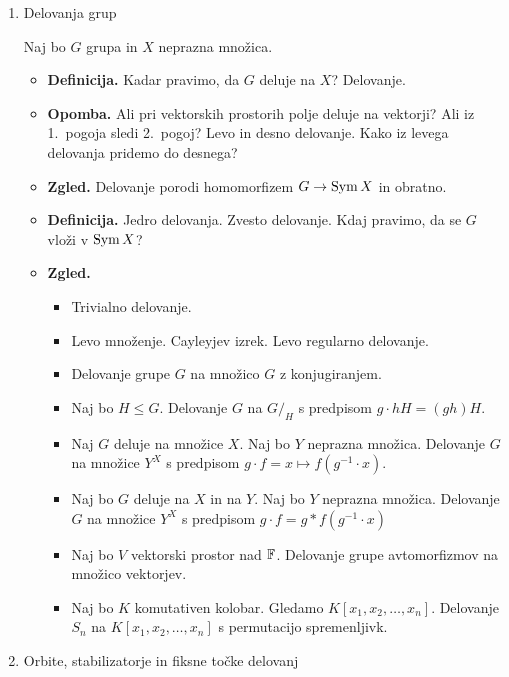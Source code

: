 \begin{enumerate}
\item Delovanja grup
    
    Naj bo \(G\) grupa in \(X\) neprazna množica.
    \begin{itemize}
        \item \textbf{Definicija.} Kadar pravimo, da \(G\) deluje na \(X\)? Delovanje.
        \item \textbf{Opomba.} Ali pri vektorskih prostorih polje deluje na vektorji? Ali iz 1.\ pogoja sledi 2.\ pogoj? Levo in desno delovanje. Kako iz levega delovanja pridemo do desnega?
        \item \textbf{Zgled.} Delovanje porodi homomorfizem \(G \to \operatorname{Sym} X\) in obratno.
        \item \textbf{Definicija.} Jedro delovanja. Zvesto delovanje. Kdaj pravimo, da se \(G\) vloži v \(\operatorname{Sym} X\)?
        \item \textbf{Zgled.} \
        \begin{itemize}
            \item Trivialno delovanje.
            \item Levo množenje. Cayleyjev izrek. Levo regularno delovanje.
            \item Delovanje grupe \(G\) na množico \(G\) z konjugiranjem.
            \item Naj bo \(H \leq G\). Delovanje \(G\) na \(G/_H\) s predpisom \(g \cdot hH = (gh)H\).
            \item Naj \(G\) deluje na množice \(X\). Naj bo \(Y\) neprazna množica. Delovanje \(G\) na množice \(Y^X\) s predpisom \(g \cdot f = x \mapsto f(g^{-1} \cdot x)\).
            \item Naj bo \(G\) deluje na \(X\) in na \(Y\). Naj bo \(Y\) neprazna množica. Delovanje \(G\) na množice \(Y^X\) s predpisom \(g \cdot f = g * f(g^{-1} \cdot x)\)
            \item Naj bo \(V\) vektorski prostor nad \(\mathbb{F}\). Delovanje grupe avtomorfizmov na množico vektorjev. 
            \item Naj bo \(K\) komutativen kolobar. Gledamo \(K[x_1, x_2, \ldots, x_n]\). Delovanje \(S_n\) na \(K[x_1, x_2, \ldots, x_n]\) s permutacijo spremenljivk.
        \end{itemize}        
    \end{itemize}

    \item Orbite, stabilizatorje in fiksne točke delovanj
    

\end{enumerate}
